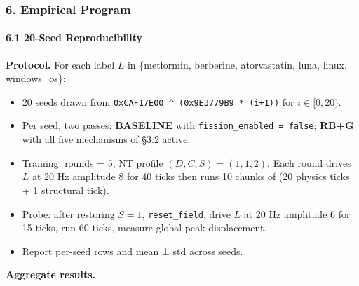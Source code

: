 \documentclass[
  11pt,
  a4paper,
]{article}
\providecommand{\tightlist}{%
  \setlength{\itemsep}{0pt}\setlength{\parskip}{0pt}}
\begin{document}
\subsubsection{6. Empirical Program}\label{empirical-program}

\paragraph{6.1 20-Seed Reproducibility}\label{seed-reproducibility}

\textbf{Protocol.} For each label \(L\) in \{metformin, berberine,
atorvastatin, luna, linux, windows\_os\}:

\begin{itemize}
\tightlist
\item
  20 seeds drawn from \texttt{0xCAF17E00\ \^{}\ (0x9E3779B9\ *\ (i+1))}
  for \(i \in [0, 20)\).
\item
  Per seed, two passes: \textbf{BASELINE} with
  \texttt{fission\_enabled\ =\ false}; \textbf{RB+G} with all five
  mechanisms of §3.2 active.
\item
  Training: rounds = 5, NT profile \((D, C, S) = (1, 1, 2)\). Each round
  drives \(L\) at 20 Hz amplitude 8 for 40 ticks then runs 10 chunks of
  (20 physics ticks + 1 structural tick).
\item
  Probe: after restoring \(S = 1\), \texttt{reset\_field}, drive \(L\)
  at 20 Hz amplitude 6 for 15 ticks, run 60 ticks, measure global peak
  displacement.
\item
  Report per-seed rows and mean ± std across seeds.
\end{itemize}

\textbf{Aggregate results.}
\end{document}

